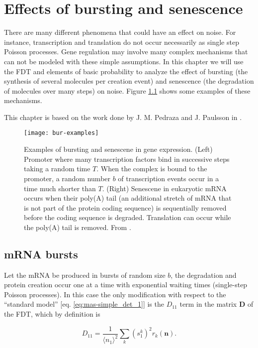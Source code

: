 \chapter{Effects of bursting and senescence}
\label{ch:bursting}

There are many different phenomena that could have an effect on noise. For instance, transcription and translation do not occur necessarily as single step Poisson processes. Gene regulation may involve many complex mechanisms that can not be modeled with these simple assumptions. In this chapter we will use the FDT and elements of basic probability to analyze the effect of bursting (the synthesis of several molecules per creation event) and senescence (the degradation of molecules over many steps) on noise. Figure \ref{fig:bur-examples} shows some examples of these mechanisms.

This chapter is based on the work done by J. M. Pedraza and J. Paulsson in \cite{pedraza08}.

\begin{figure}[H]
  \centering
  \texttt{[image: bur-examples]}
  \caption[Examples of bursting and senescence in gene expression]{\label{fig:bur-examples} Examples of bursting and senescene in gene expression. (Left) Promoter where many transcription factors bind in successive steps taking a random time $T$. When the complex is bound to the promoter, a random number $b$ of transcription events occur in a time much shorter than $T$. (Right) Senescene in eukaryotic mRNA occurs when their poly(A) tail (an additional stretch of mRNA that is not part of the protein coding sequence) is sequentially removed before the coding sequence is degraded. Translation can occur while the poly(A) tail is removed. From \cite{pedraza08}.}
\end{figure}

\section{mRNA bursts}
Let the mRNA be produced in bursts of random size $b$, the degradation and protein creation occur one at a time with exponential waiting times (single-step Poisson processes). In this case the only modification with respect to the ``standard model'' [eq. \eqref{eq:mas-simple_det_1}] is the $D_{11}$ term in the matrix $\mathbf{D}$ of the FDT, which by definition is

\begin{equation}
  \label{eq:mrnab1}
  D_{11}=\frac{1}{\langle n_1\rangle^2}\sum_k(s_1^k)^2r_k(\mathbf{n}).
\end{equation}

